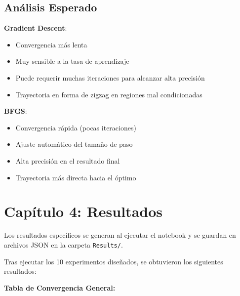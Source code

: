 \documentclass[12pt,a4paper]{article}
\begin{document}
\subsection*{Análisis Esperado}

\textbf{Gradient Descent}:
\begin{itemize}
    \item Convergencia más lenta
    \item Muy sensible a la tasa de aprendizaje
    \item Puede requerir muchas iteraciones para alcanzar alta precisión
    \item Trayectoria en forma de zigzag en regiones mal condicionadas
\end{itemize}

\textbf{BFGS}:
\begin{itemize}
    \item Convergencia rápida (pocas iteraciones)
    \item Ajuste automático del tamaño de paso
    \item Alta precisión en el resultado final
    \item Trayectoria más directa hacia el óptimo
\end{itemize}

\newpage

\section*{Capítulo 4: Resultados}

Los resultados específicos se generan al ejecutar el notebook y se guardan en archivos JSON en la carpeta \texttt{Results/}.

Tras ejecutar los 10 experimentos diseñados, se obtuvieron los siguientes resultados:

\textbf{Tabla de Convergencia General:}
\end{document}
